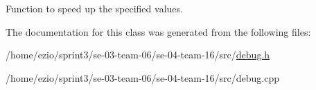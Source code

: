 Function to speed up the specified values. 

The documentation for this class was generated from the following files\+:\begin{DoxyCompactItemize}
\item 
/home/ezio/sprint3/se-\/03-\/team-\/06/se-\/04-\/team-\/16/src/\hyperlink{debug_8h}{debug.\+h}\item 
/home/ezio/sprint3/se-\/03-\/team-\/06/se-\/04-\/team-\/16/src/debug.\+cpp\end{DoxyCompactItemize}
